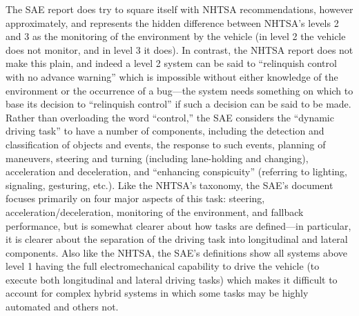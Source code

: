 The SAE report does try to square itself with NHTSA recommendations,
however approximately, and represents the hidden difference between
NHTSA's levels 2 and 3 as the monitoring of the environment by the
vehicle (in level 2 the vehicle does not monitor, and in level 3 it
does). In contrast, the NHTSA report does not make this plain, and
indeed a level 2 system can be said to ``relinquish control with no
advance warning'' which is impossible without either knowledge of the
environment or the occurrence of a bug---the system needs something on
which to base its decision to ``relinquish control'' if such a decision
can be said to be made.\cite[p. 5]{NHTSA} Rather than overloading the word ``control,''
the SAE considers the ``dynamic driving task'' to have a number of
components, including the detection and classification of objects and
events, the response to such events, planning of maneuvers, steering
and turning (including lane-holding and changing), acceleration and
deceleration, and ``enhancing conspicuity'' (referring to lighting,
signaling, gesturing, etc.).\cite[p. 6]{SAE} Like the NHTSA's taxonomy, the SAE's
document focuses primarily on four major aspects of this task:
steering, acceleration/deceleration, monitoring of the environment,
and fallback performance, but is somewhat clearer about how tasks are
defined---in particular, it is clearer about the separation of the
driving task into longitudinal and lateral components. Also like the
NHTSA, the SAE's definitions show all systems above level 1 having the
full electromechanical capability to drive the vehicle (to execute
both longitudinal and lateral driving tasks) which makes it difficult
to account for complex hybrid systems in which some tasks may be
highly automated and others not.

